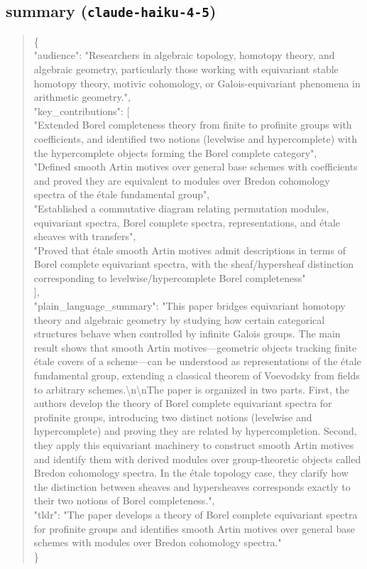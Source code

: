 \documentclass[11pt]{article}
\begin{document}
\subsection*{summary (\texttt{claude-haiku-4-5})}
\begin{quote}\small\ttfamily\raggedright
\{\\
  "audience": "Researchers in algebraic topology, homotopy theory, and algebraic geometry, particularly those working with equivariant stable homotopy theory, motivic cohomology, or Galois-equivariant phenomena in arithmetic geometry.",\\
  "key\_contributions": [\\
    "Extended Borel completeness theory from finite to profinite groups with coefficients, and identified two notions (levelwise and hypercomplete) with the hypercomplete objects forming the Borel complete category",\\
    "Defined smooth Artin motives over general base schemes with coefficients and proved they are equivalent to modules over Bredon cohomology spectra of the étale fundamental group",\\
    "Established a commutative diagram relating permutation modules, equivariant spectra, Borel complete spectra, representations, and étale sheaves with transfers",\\
    "Proved that étale smooth Artin motives admit descriptions in terms of Borel complete equivariant spectra, with the sheaf/hypersheaf distinction corresponding to levelwise/hypercomplete Borel completeness"\\
  ],\\
  "plain\_language\_summary": "This paper bridges equivariant homotopy theory and algebraic geometry by studying how certain categorical structures behave when controlled by infinite Galois groups. The main result shows that smooth Artin motives---geometric objects tracking finite étale covers of a scheme---can be understood as representations of the étale fundamental group, extending a classical theorem of Voevodsky from fields to arbitrary schemes.\textbackslash{}n\textbackslash{}nThe paper is organized in two parts. First, the authors develop the theory of Borel complete equivariant spectra for profinite groups, introducing two distinct notions (levelwise and hypercomplete) and proving they are related by hypercompletion. Second, they apply this equivariant machinery to construct smooth Artin motives and identify them with derived modules over group-theoretic objects called Bredon cohomology spectra. In the étale topology case, they clarify how the distinction between sheaves and hypersheaves corresponds exactly to their two notions of Borel completeness.",\\
  "tldr": "The paper develops a theory of Borel complete equivariant spectra for profinite groups and identifies smooth Artin motives over general base schemes with modules over Bredon cohomology spectra."\\
\}\\
\end{quote}
\end{document}
